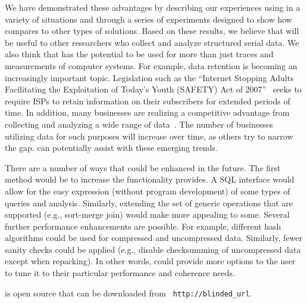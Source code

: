 We have demonstrated these advantages by describing our experiences
using \DataSeries{} in a variety of situations and through a series of
experiments designed to show how \DataSeries{} compares to other types of
solutions. Based on these results,
we believe that \DataSeries{} will be useful to other researchers
who collect and analyze structured serial data.
We also think that \DataSeries{} has the potential to be
used for more than just traces and measurements of computer systems.
For example, data retention is becoming an increasingly important topic.
Legislation such as the ``Internet Stopping Adults Facilitating
the Exploitation of Today's Youth (SAFETY) Act of 2007''~\cite{SAFETY} seeks
to require ISPs to retain information on their subscribers for
extended periods of time.
In addition, many businesses are realizing a competitive advantage from
collecting and analyzing a wide range of data~\cite{HURD}.
The number of businesses utilizing data for such purposes
will increase over time, as others try to narrow the gap.
\DataSeries{} can potentially assist with these emerging trends.

There are a number of ways that \DataSeries{} could be enhanced in the future.
The first method would be to increase the functionality \DataSeries{} provides.
A SQL interface would allow for the easy expression (without
program development) of some types of queries and analysis.
Similarly, extending the set of generic operations that are supported
(e.g., sort-merge join) would make \DataSeries{} more appealing to some.
Several further performance enhancements are possible.
For example, different hash algorithms could be used for compressed
and uncompressed data.  Similarly, fewer sanity checks could be applied
(e.g., disable checksumming of uncompressed data except when repacking).
In other words, \DataSeries{} could provide more options to the user to
tune it to their particular performance and coherence needs.

\DataSeries{} is open source that can be downloaded from {\tt
http://blinded\_url}.
